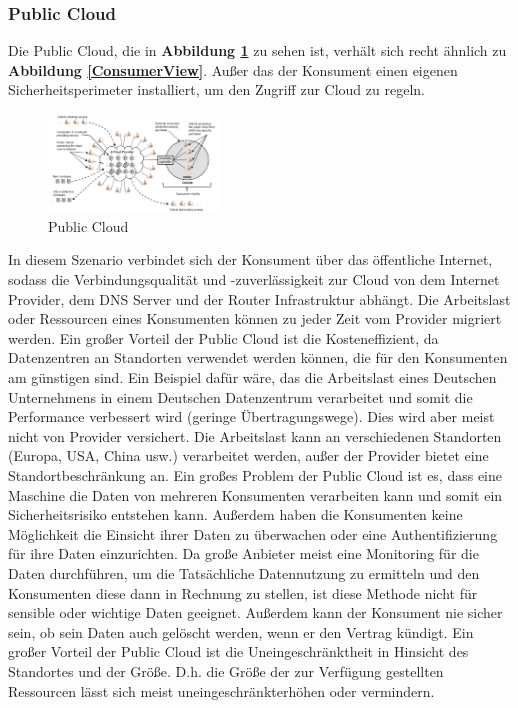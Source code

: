 \subsubsection{Public Cloud}

Die Public Cloud, die in \textbf{Abbildung \ref{PublicCloud}} zu sehen ist, verhält sich recht ähnlich zu \textbf{Abbildung \ref{ConsumerView}}.
Außer das der Konsument einen eigenen Sicherheitsperimeter installiert, um den Zugriff zur Cloud zu regeln.

 
\begin{figure}[H]
    \centering
	\includegraphics[width=0.4\textwidth]{Images/PublicCloud}
	\caption{Public Cloud \cite{Badger}}
	\label{PublicCloud}
\end{figure}

In diesem Szenario verbindet sich der Konsument über das öffentliche Internet, sodass die Verbindungsqualität und -zuverlässigkeit zur Cloud
von dem Internet Provider, dem DNS Server und der Router Infrastruktur abhängt. Die Arbeitslast oder Ressourcen eines Konsumenten können zu jeder Zeit
vom Provider migriert werden. Ein großer Vorteil der Public Cloud ist die Kosteneffizient, da Datenzentren an Standorten verwendet werden können, die für den Konsumenten am günstigen sind.
Ein Beispiel dafür wäre, das die Arbeitslast eines Deutschen Unternehmens in einem Deutschen Datenzentrum verarbeitet und somit die Performance verbessert wird (geringe Übertragungswege).
Dies wird aber meist nicht von Provider versichert. Die Arbeitslast kann an verschiedenen Standorten (Europa, USA, China usw.) verarbeitet werden, außer der Provider bietet eine
Standortbeschränkung an. Ein großes Problem der Public Cloud ist es, dass eine Maschine die Daten von mehreren Konsumenten verarbeiten kann und somit ein Sicherheitsrisiko entstehen kann.
Außerdem haben die Konsumenten keine Möglichkeit die Einsicht ihrer Daten zu überwachen oder eine Authentifizierung für ihre Daten einzurichten. Da große Anbieter meist eine Monitoring für die
Daten durchführen, um die Tatsächliche Datennutzung zu ermitteln und den Konsumenten diese dann in Rechnung zu stellen, ist diese Methode nicht für sensible oder wichtige Daten geeignet.
Außerdem kann der Konsument nie sicher sein, ob sein Daten auch gelöscht werden, wenn er den Vertrag kündigt. 
Ein großer Vorteil der Public Cloud ist die Uneingeschränktheit in Hinsicht des Standortes und der Größe. D.h. die Größe der zur Verfügung gestellten Ressourcen lässt sich 
meist \glqq uneingeschränkt\grqq erhöhen oder vermindern.

